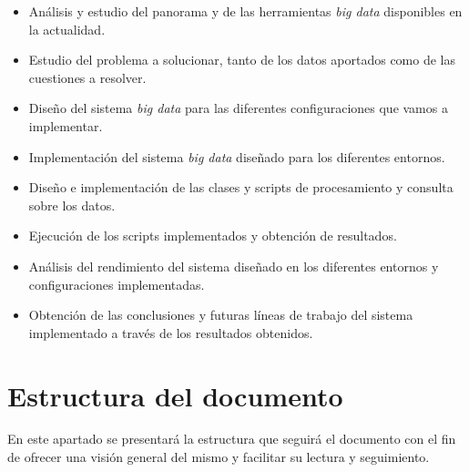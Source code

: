 \begin{itemize}
\item Análisis y estudio del panorama y de las herramientas \textit{big data} disponibles en la actualidad.

\item Estudio del problema a solucionar, tanto de los datos aportados como de las cuestiones a resolver.

\item Diseño del sistema \textit{big data} para las diferentes configuraciones que vamos a implementar.

\item Implementación del sistema \textit{big data} diseñado para los diferentes entornos.

\item Diseño e implementación de las clases y scripts de procesamiento y consulta sobre los datos.

\item Ejecución de los scripts implementados y obtención de resultados.

\item Análisis del rendimiento del sistema diseñado en los diferentes entornos y configuraciones implementadas.

\item Obtención de las conclusiones y futuras líneas de trabajo del sistema implementado a través de los resultados obtenidos. 
\end{itemize}

\section{Estructura del documento}

En este apartado se presentará la estructura que seguirá el documento con el fin de ofrecer una visión general del mismo y facilitar su lectura y seguimiento.

